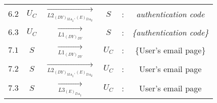 \begin{center}
\begin{tabular}{ p{.25cm} c c c c c }
$6.2$ & $U_C$ & $\xrightarrow[L2_{{(DY)}_{{MA}_1},{(E)}_{{DA}_2}}]{}$ & $S$ & : & \textit{authentication code} \\ 

$6.3$ & $U_C$ & $\xrightarrow[L1_{(DY)_{DY}}]{}$ & $S$ & : & \textit{\{authentication code\}} \\ 


$7.1$ & $S$ & $\xrightarrow[L1_{(DY)_{DY}}]{}$ & $U_C$ & : & \{User's email page\} \\ 

$7.2$ & $S$ & $\xrightarrow[L2_{{(DY)}_{{MA}_1},{(E)}_{{DA}_2}}]{}$ & $U_C$ & : & User's email page \\ 

$7.3$ & $S$ & $\xrightarrow[L3_{{(E)}_{{DA}_1}}]{}$ & $U_C$ & : & User's email page \\ 

\end{tabular} 
\end{center} 
